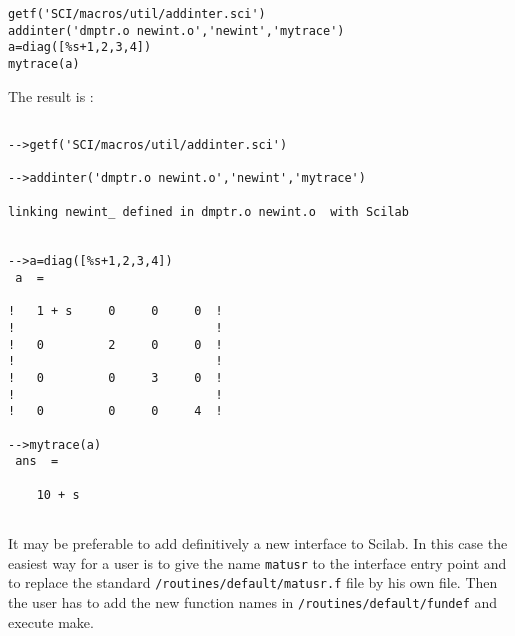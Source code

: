 \begin{verbatim}
getf('SCI/macros/util/addinter.sci')
addinter('dmptr.o newint.o','newint','mytrace')
a=diag([%s+1,2,3,4])
mytrace(a)
\end{verbatim}


The result is :

\begin{verbatim}

-->getf('SCI/macros/util/addinter.sci')
 
-->addinter('dmptr.o newint.o','newint','mytrace')

linking newint_ defined in dmptr.o newint.o  with Scilab 

 
-->a=diag([%s+1,2,3,4])
 a  =
 
!   1 + s     0     0     0  !
!                            !
!   0         2     0     0  !
!                            !
!   0         0     3     0  !
!                            !
!   0         0     0     4  !
 
-->mytrace(a)
 ans  =
 
    10 + s   
 
\end{verbatim}

It may be preferable to add definitively a new interface to Scilab.
In this case the easiest way for a user is to give the name {\tt matusr} to the
interface entry point and to replace the standard 
{\tt <scilab dir>/routines/default/matusr.f} file by his own file. Then the 
user has to add the new function names in {\tt <scilab dir>/routines/default/fundef} and execute make.


